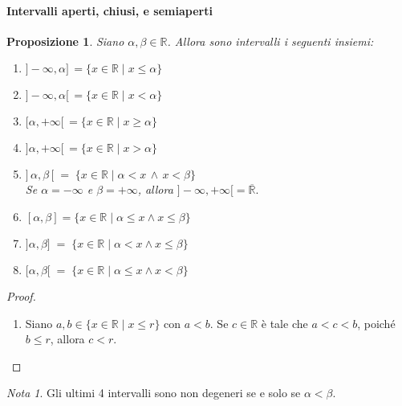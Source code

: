 \documentclass{article}
\theoremstyle{plain}
\newtheorem{prop}[thm]{Proposizione}
\theoremstyle{definition}
\theoremstyle{remark}
\newtheorem{note}{Nota}
\begin{document}
\paragraph{Intervalli aperti, chiusi, e semiaperti}
\begin{bxthm}
\begin{prop}
    Siano \(\alpha, \beta \in \mathbb{R}\). Allora sono intervalli i seguenti insiemi:
    \begin{enumerate}
        \item \(]-\infty,\alpha]\,=\{x \in \mathbb{R} \mid x \leq \alpha\}\)
        \item \(]-\infty,\alpha[\,=\{x \in \mathbb{R} \mid x < \alpha\}\) 
        \item \([\alpha,+\infty[\,=\{x \in \mathbb{R} \mid x \geq \alpha\}\) 
        \item \(]\alpha,+\infty[\,=\{x \in \mathbb{R} \mid x > \alpha\}\) 
        \item $ ]\,\alpha,\beta\,[ \;=\; \{x \in \mathbb{R} \mid \alpha < x \,\land\, x < \beta\}$\\
        Se $\alpha=-\infty$ e $\beta=+\infty$, allora $]-\infty,+\infty[=\overline{\mathbb{R}}.$
        \item $[\alpha,\beta] = \{x \in \mathbb{R} \mid \alpha \leq x \land x \leq \beta\}$
        \item $ ]\alpha,\beta] \;=\; \{x \in \mathbb{R} \mid \alpha < x \land x \leq \beta\}$\\
        \item $ [\alpha,\beta[ \;=\; \{x \in \mathbb{R} \mid \alpha \leq x \land x < \beta\} $\\ 
    \end{enumerate}
\end{prop}
\end{bxthm}
\begin{proof}\hfill
    \begin{enumerate}
        \item Siano \(a, b \in \{x \in \mathbb{R} \mid x \leq r\}\) con \(a < b\). 
        Se \(c \in \mathbb{R}\) è tale che \(a < c < b\), poiché \(b \leq r\), allora \(c < r\).
    \end{enumerate}
\end{proof}

\vspace{10pt}

\begin{note}
    Gli ultimi 4 intervalli sono non degeneri se e solo se $\alpha<\beta$.
\end{note}
\end{document}
